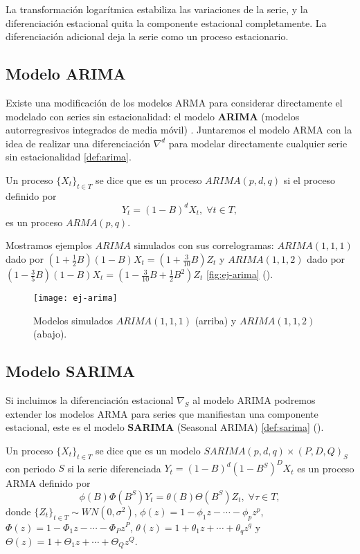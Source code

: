 La transformación logarítmica estabiliza las variaciones de la serie, y la diferenciación estacional quita la componente estacional completamente. La diferenciación adicional deja la serie como un proceso estacionario.

\subsection{Modelo ARIMA}

Existe una modificación de los modelos ARMA para considerar directamente el modelado con series sin estacionalidad: el modelo \textbf{ARIMA} (modelos autorregresivos integrados de media móvil) \cite{box2011time}. Juntaremos el modelo ARMA con la idea de realizar una diferenciación $\nabla^d$ para modelar directamente cualquier serie sin estacionalidad \autoref{def:arima}.

\begin{definicion}
  Un proceso $\{X_t\}_{t \in T}$ se dice que es un proceso $ARIMA(p, d, q)$ si el proceso definido por
  $$Y_t = (1 - B)^d X_t, \; \forall t \in T,$$
  es un proceso $ARMA(p, q)$.
\label{def:arima}
\end{definicion}

Mostramos ejemplos $ARIMA$ simulados con sus correlogramas: $ARIMA(1, 1, 1)$ dado por $(1 + \frac{1}{2}B)(1-B)X_t = (1+\frac{3}{10}B)Z_t$ y $ARIMA(1, 1, 2)$ dado por $(1 - \frac{3}{5}B)(1-B)X_t = (1-\frac{3}{10}B+\frac{1}{2}B^2)Z_t$ \autoref{fig:ej-arima} (\cite{chatfield2019analysis}).

\begin{figure}[htpb]
  \centering
  \texttt{[image: ej-arima]}
  \caption{Modelos simulados $ARIMA(1, 1, 1)$ (arriba) y $ARIMA(1, 1, 2)$ (abajo).}
  \label{fig:ej-arima}
\end{figure}

\subsection{Modelo SARIMA}

Si incluimos la diferenciación estacional $\nabla_S$ al modelo ARIMA podremos extender los modelos ARMA para series que manifiestan una componente estacional, este es el modelo \textbf{SARIMA} (Seasonal ARIMA) \autoref{def:sarima} (\cite{box2011time}).

\begin{definicion}
  Un proceso $\{X_t\}_{t \in T}$ se dice que es un modelo $SARIMA(p,d,q)\times(P,D,Q)_S$ con periodo $S$ si la serie diferenciada $Y_t = (1 - B)^d(1 - B^S)^D X_t$ es un proceso ARMA definido por
  $$\phi(B)\Phi(B^S)Y_t = \theta(B)\Theta(B^S)Z_t, \; \forall \tau \in T,$$
  donde $\{Z_t\}_{t \in T} \sim WN(0, \sigma^2)$, $\phi(z) = 1 - \phi_1 z - \cdots - \phi_p z^p$, $\Phi(z) = 1 - \Phi_1z - \cdots - \Phi_P z^P$, $\theta(z) = 1 + \theta_1 z + \cdots + \theta_qz^q$ y $\Theta(z) = 1 + \Theta_1z + \cdots + \Theta_Q z^Q$.
\label{def:sarima}
\end{definicion}

